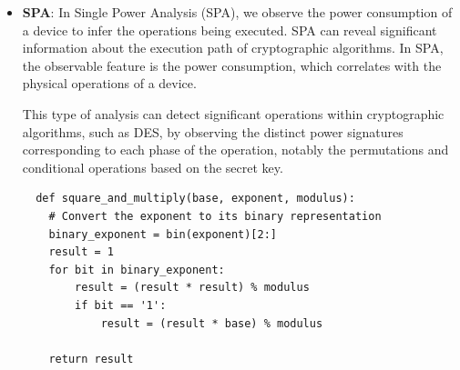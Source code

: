 \begin{itemize}
  \item \textbf{SPA}: In Single Power Analysis (SPA), we observe the power consumption of a device to infer the operations being executed. SPA can reveal significant information about the execution path of cryptographic algorithms.
  In SPA, the observable feature is the power consumption, which correlates with the physical operations of a device. 

  This type of analysis can detect significant operations within cryptographic algorithms, such as DES, by observing the distinct power signatures corresponding to each phase of the operation, notably the permutations and conditional operations based on the secret key\cite{kocherDifferentialPowerAnalysis1999}.

  \begin{verbatim}
  def square_and_multiply(base, exponent, modulus):
    # Convert the exponent to its binary representation
    binary_exponent = bin(exponent)[2:]
    result = 1
    for bit in binary_exponent:
        result = (result * result) % modulus
        if bit == '1':
            result = (result * base) % modulus
    
    return result
  \end{verbatim}
\end{itemize}

